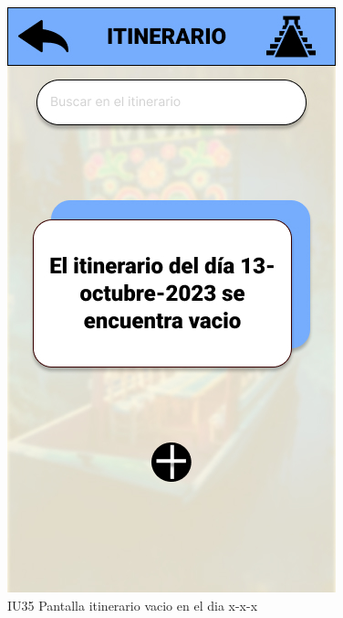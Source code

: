 \begin{figure}[h]
    \begin{minipage}{0.5\textwidth}
        \centering
        \includegraphics[width=.7\linewidth]{Pantallas Prototipo3/IU35-itinerario vacio en el dia x-x-x.jpg}
        \caption{IU35 Pantalla itinerario vacio en el dia x-x-x}
    \end{minipage}
    

\end{figure}
